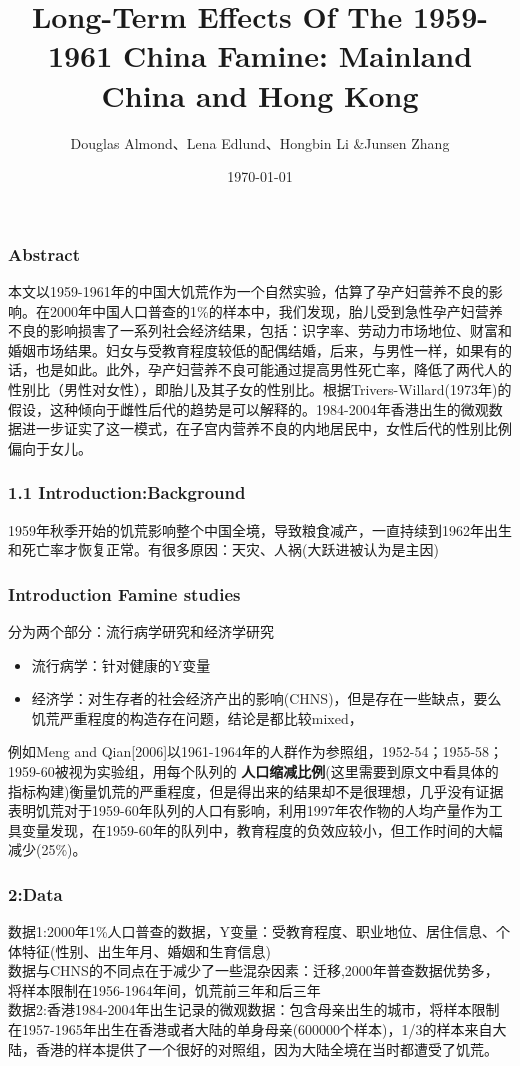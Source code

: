 \documentclass{beamer}
\title[文献分享:ZY]{Long-Term Effects Of The 1959-1961 China Famine: Mainland China and Hong Kong}
\author[Famine\_workshop]{Douglas Almond、Lena Edlund、Hongbin Li \&Junsen Zhang}
\date{\today}
\begin{document}
\frame{\titlepage}


\begin{frame}
	\frametitle{Abstract}
本文以1959-1961年的中国大饥荒作为一个自然实验，估算了孕产妇营养不良的影响。在2000年中国人口普查的1\%的样本中，我们发现，胎儿受到急性孕产妇营养不良的影响损害了一系列社会经济结果，包括：识字率、劳动力市场地位、财富和婚姻市场结果。妇女与受教育程度较低的配偶结婚，后来，与男性一样，如果有的话，也是如此。此外，孕产妇营养不良可能通过提高男性死亡率，降低了两代人的性别比（男性对女性），即胎儿及其子女的性别比。根据Trivers-Willard(1973年)的假设，这种倾向于雌性后代的趋势是可以解释的。1984-2004年香港出生的微观数据进一步证实了这一模式，在子宫内营养不良的内地居民中，女性后代的性别比例偏向于女儿。
\end{frame}


\begin{frame}
    \frametitle{1.1 Introduction:Background}
1959年秋季开始的饥荒影响整个中国全境，导致粮食减产，一直持续到1962年出生和死亡率才恢复正常。有很多原因：天灾、人祸(大跃进被认为是主因)

\end{frame}


\begin{frame}
	\frametitle{Introduction Famine studies}
分为两个部分：流行病学研究和经济学研究
	\begin{itemize}
		\item 流行病学：针对健康的Y变量
		\item 经济学：对生存者的社会经济产出的影响(CHNS)，但是存在一些缺点，要么饥荒严重程度的构造存在问题，结论是都比较mixed，
	\end{itemize}
例如Meng and Qian[2006]以1961-1964年的人群作为参照组，1952-54；1955-58；1959-60被视为实验组，用每个队列的 \textcolor[rgb]{1,0,0}{\textbf{人口缩减比例}}(这里需要到原文中看具体的指标构建)衡量饥荒的严重程度，但是得出来的结果却不是很理想，几乎没有证据表明饥荒对于1959-60年队列的人口有影响，利用1997年农作物的人均产量作为工具变量发现，在1959-60年的队列中，教育程度的负效应较小，但工作时间的大幅减少(25\%)。
\end{frame}


\begin{frame}
	\frametitle{2:Data}
	数据1:2000年1\%人口普查的数据，Y变量：受教育程度、职业地位、居住信息、个体特征(性别、出生年月、婚姻和生育信息)
	\\数据与CHNS的不同点在于减少了一些混杂因素：迁移,2000年普查数据优势多，将样本限制在1956-1964年间，饥荒前三年和后三年
	\\数据2:香港1984-2004年出生记录的微观数据：包含母亲出生的城市，将样本限制在1957-1965年出生在香港或者大陆的单身母亲(600000个样本)，1/3的样本来自大陆，香港的样本提供了一个很好的对照组，因为大陆全境在当时都遭受了饥荒。
\end{frame}
\end{document}
